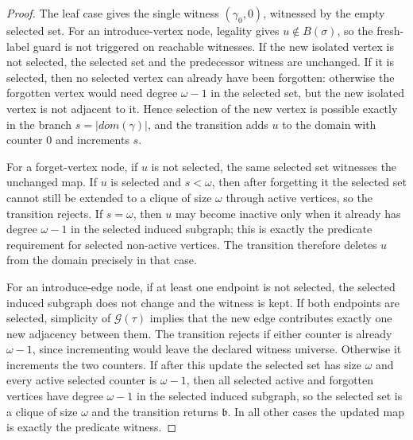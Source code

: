\documentclass[11pt,a4paper]{article}
\newcommand{\decompositiongraph}[1]{\mathcal{G}(#1)}
\newcommand{\topbagname}{B}
\newcommand{\topbag}[1]{\topbagname(#1)}
\newcommand{\abstractdecomposition}{\tau}
\newcommand{\sigmaabstractdecomposition}{\sigma}
\newcommand{\vertexone}{u}
\newcommand{\domain}{dom}
\newcommand{\cliqueparameter}{\omega}
\newcommand{\cliquemap}{\gamma}
\newcommand{\cliquesize}{s}
\newcommand{\cliquefound}{\mathfrak{b}}
\begin{document}
{\begin{proof}
				The leaf case gives the single witness $(\cliquemap_0,0)$, witnessed by the empty selected set. For an introduce-vertex node, legality gives $\vertexone\notin\topbag{\sigmaabstractdecomposition}$, so the fresh-label guard is not triggered on reachable witnesses. If the new isolated vertex is not selected, the selected set and the predecessor witness are unchanged. If it is selected, then no selected vertex can already have been forgotten: otherwise the forgotten vertex would need degree $\cliqueparameter-1$ in the selected set, but the new isolated vertex is not adjacent to it. Hence selection of the new vertex is possible exactly in the branch $\cliquesize=|\domain(\cliquemap)|$, and the transition adds $\vertexone$ to the domain with counter $0$ and increments $\cliquesize$.

				For a forget-vertex node, if $\vertexone$ is not selected, the same selected set witnesses the unchanged map. If $\vertexone$ is selected and $\cliquesize<\cliqueparameter$, then after forgetting it the selected set cannot still be extended to a clique of size $\cliqueparameter$ through active vertices, so the transition rejects. If $\cliquesize=\cliqueparameter$, then $\vertexone$ may become inactive only when it already has degree $\cliqueparameter-1$ in the selected induced subgraph; this is exactly the predicate requirement for selected non-active vertices. The transition therefore deletes $\vertexone$ from the domain precisely in that case.

				For an introduce-edge node, if at least one endpoint is not selected, the selected induced subgraph does not change and the witness is kept. If both endpoints are selected, simplicity of $\decompositiongraph{\abstractdecomposition}$ implies that the new edge contributes exactly one new adjacency between them. The transition rejects if either counter is already $\cliqueparameter-1$, since incrementing would leave the declared witness universe. Otherwise it increments the two counters. If after this update the selected set has size $\cliqueparameter$ and every active selected counter is $\cliqueparameter-1$, then all selected active and forgotten vertices have degree $\cliqueparameter-1$ in the selected induced subgraph, so the selected set is a clique of size $\cliqueparameter$ and the transition returns $\cliquefound$. In all other cases the updated map is exactly the predicate witness.


\end{proof}}
\end{document}
